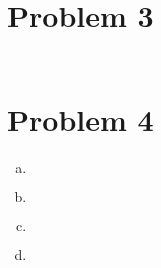\documentclass{article}
\begin{document}
\begin{flushleft}
	\section*{Problem 3}
\begin{multline*}
\end{multline*}

	\section*{Problem 4}
\begin{enumerate}[(a)]
	\item 
\begin{multline*}
\end{multline*}
	\item 
\begin{multline*}
\end{multline*}
	\item 
\begin{multline*}
\end{multline*}
	\item 
\begin{multline*}
\end{multline*}

\end{enumerate}

\end{flushleft}
\end{document}
